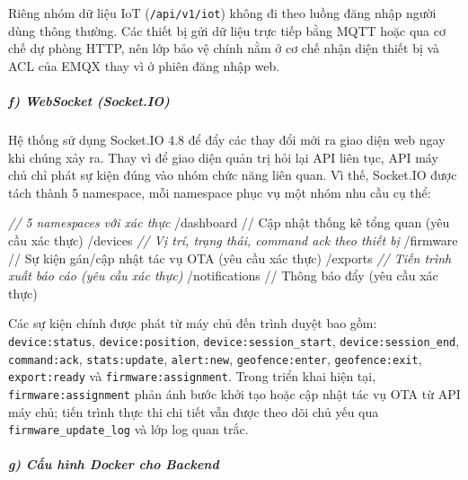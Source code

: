 \documentclass[a4paper]{extarticle}
\newenvironment{Shaded}{}{}
\newcommand{\CommentTok}[1]{\textcolor[rgb]{0.38,0.63,0.69}{\textit{#1}}}
\newcommand{\FunctionTok}[1]{\textcolor[rgb]{0.02,0.16,0.49}{#1}}
\newcommand{\NormalTok}[1]{#1}
\newcommand{\OperatorTok}[1]{\textcolor[rgb]{0.40,0.40,0.40}{#1}}
\newcommand{\SpecialCharTok}[1]{\textcolor[rgb]{0.25,0.44,0.63}{#1}}
\newcommand{\SpecialStringTok}[1]{\textcolor[rgb]{0.73,0.40,0.53}{#1}}
\begin{document}
Riêng nhóm dữ liệu IoT (\texttt{/api/v1/iot}) không đi theo luồng đăng nhập
người dùng thông thường. Các thiết bị gửi dữ liệu trực tiếp bằng MQTT
hoặc qua cơ chế dự phòng HTTP, nên lớp bảo vệ chính nằm ở cơ chế nhận
diện thiết bị và ACL của EMQX thay vì ở phiên đăng nhập web.

\subparagraph{f) WebSocket (Socket.IO)}\label{f-websocket-socketio}

Hệ thống sử dụng Socket.IO 4.8 để đẩy các thay đổi mới ra giao diện web
ngay khi chúng xảy ra. Thay vì để giao diện quản trị hỏi lại API liên
tục, API máy chủ chỉ phát sự kiện đúng vào nhóm chức năng liên
quan. Vì thế, Socket.IO được tách thành 5 namespace, mỗi namespace phục
vụ một nhóm nhu cầu cụ thể:

\begin{Shaded}
\begin{Highlighting}[]
\CommentTok{// 5 namespaces với xác thực}
\SpecialStringTok{/dashboard      // Cập nhật thống kê tổng quan }\SpecialCharTok{(}\SpecialStringTok{yêu cầu xác thực}\SpecialCharTok{)}
\SpecialStringTok{/devices}        \CommentTok{// Vị trí, trạng thái, command ack theo thiết bị}
\SpecialStringTok{/firmware       // Sự kiện gán/cập}\NormalTok{ nhật tác vụ }\FunctionTok{OTA}\NormalTok{ (yêu cầu xác thực)}
\OperatorTok{/}\NormalTok{exports        }\CommentTok{// Tiến trình xuất báo cáo (yêu cầu xác thực)}
\SpecialStringTok{/notifications  // Thông báo đẩy }\SpecialCharTok{(}\SpecialStringTok{yêu cầu xác thực}\SpecialCharTok{)}
\end{Highlighting}
\end{Shaded}

Các sự kiện chính được phát từ máy chủ đến trình duyệt bao gồm:
\texttt{device:status}, \texttt{device:position},
\texttt{device:session\_start}, \texttt{device:session\_end},
\texttt{command:ack}, \texttt{stats:update}, \texttt{alert:new},
\texttt{geofence:enter}, \texttt{geofence:exit}, \texttt{export:ready}
và \texttt{firmware:assignment}. Trong triển khai hiện tại,
\texttt{firmware:assignment} phản ánh bước khởi tạo hoặc cập nhật tác vụ
OTA từ API máy chủ; tiến trình thực thi chi tiết vẫn được theo dõi chủ yếu
qua \texttt{firmware\_update\_log} và lớp log quan trắc.

\subparagraph{g) Cấu hình Docker cho
Backend}\label{g-cux1ea5u-huxecnh-docker-cho-backend}
\end{document}
